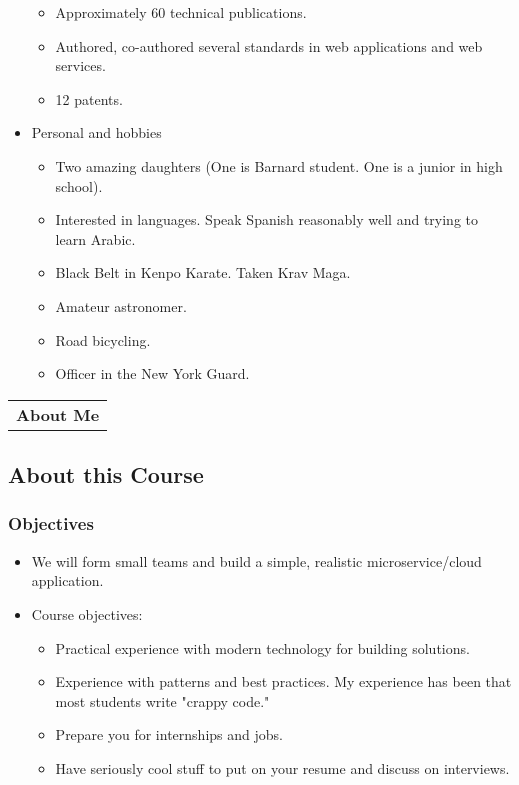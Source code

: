 \documentclass[11pt]{article}
\providecommand{\tightlist}{%
      \setlength{\itemsep}{0pt}\setlength{\parskip}{0pt}}
\begin{document}
\begin{itemize}
  \begin{itemize}
  \tightlist
  \item
    Approximately 60 technical publications.
  \item
    Authored, co-authored several standards in web applications and web
    services.
  \item
    12 patents.
  \end{itemize}
\item
  Personal and hobbies

  \begin{itemize}
  \tightlist
  \item
    Two amazing daughters (One is Barnard student. One is a junior in
    high school).
  \item
    Interested in languages. Speak Spanish reasonably well and trying to
    learn Arabic.
  \item
    Black Belt in Kenpo Karate. Taken Krav Maga.
  \item
    Amateur astronomer.
  \item
    Road bicycling.
  \item
    Officer in the New York Guard.
  \end{itemize}
\end{itemize}

\begin{longtable}[]{@{}c@{}}
\toprule
\tabularnewline
\midrule
\endhead
\textbf{About Me}\tabularnewline
\bottomrule
\end{longtable}

    \subsection{About this Course}\label{about-this-course}

\subsubsection{Objectives}\label{objectives}

\begin{itemize}
\item
  We will form small teams and build a simple, realistic
  microservice/cloud application.
\item
  Course objectives:

  \begin{itemize}
  \tightlist
  \item
    Practical experience with modern technology for building solutions.
  \item
    Experience with patterns and best practices. My experience has been
    that most students write "crappy code."
  \item
    Prepare you for internships and jobs.
  \item
    Have seriously cool stuff to put on your resume and discuss on
    interviews.
  \end{itemize}
\end{itemize}
\end{document}
